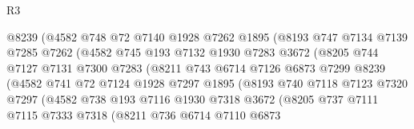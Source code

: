 \begin{lexlean}{R3}
\begin{coremodule}
                        @8239
                        (@4582
                          @748
                          @72
                          @7140
                          @1928
                          @7262
                          @1895
                          (@8193
                            @747
                            @7134
                            @7139
                            @7285
                            @7262
                            (@4582
                              @745
                              @193
                              @7132
                              @1930
                              @7283
                              @3672
                              (@8205
                                @744
                                @7127
                                @7131
                                @7300
                                @7283
                                (@8211
                                  @743
                                  @6714
                                  @7126
                                  @6873
                                  @7299
                                  @8239
                                  (@4582
                                    @741
                                    @72
                                    @7124
                                    @1928
                                    @7297
                                    @1895
                                    (@8193
                                      @740
                                      @7118
                                      @7123
                                      @7320
                                      @7297
                                      (@4582
                                        @738
                                        @193
                                        @7116
                                        @1930
                                        @7318
                                        @3672
                                        (@8205
                                          @737
                                          @7111
                                          @7115
                                          @7333
                                          @7318
                                          (@8211
                                            @736
                                            @6714
                                            @7110
                                            @6873

\end{coremodule}
\end{lexlean}
